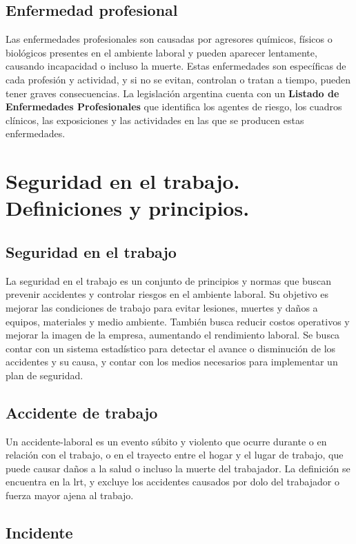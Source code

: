 \subsection{Enfermedad profesional}

Las enfermedades profesionales son causadas por agresores químicos, físicos o
biológicos presentes en el ambiente laboral y pueden aparecer lentamente,
causando incapacidad o incluso la muerte. Estas enfermedades son específicas de
cada profesión y actividad, y si no se evitan, controlan o tratan a tiempo,
pueden tener graves consecuencias. La legislación argentina cuenta con un
\textbf{Listado de Enfermedades Profesionales} que identifica los agentes de
riesgo, los cuadros clínicos, las exposiciones y las actividades en las que se
producen estas enfermedades.

\section{Seguridad en el trabajo. Definiciones y principios.}

\subsection{Seguridad en el trabajo}

La seguridad en el trabajo es un conjunto de principios y normas que buscan
prevenir accidentes y controlar riesgos en el ambiente laboral. Su objetivo es
mejorar las condiciones de trabajo para evitar lesiones, muertes y daños a
equipos, materiales y medio ambiente. También busca reducir costos operativos y
mejorar la imagen de la empresa, aumentando el rendimiento laboral. Se busca
contar con un sistema estadístico para detectar el avance o disminución de los
accidentes y su causa, y contar con los medios necesarios para implementar un
plan de seguridad.

\subsection{Accidente de trabajo}

Un \gls{accidente-laboral} es un evento súbito y violento que ocurre durante
o en relación con el trabajo, o en el trayecto entre el hogar y el lugar de 
trabajo, que puede causar daños a la salud o incluso la muerte del trabajador.
La definición se encuentra en la \acrfull{lrt}, y excluye los accidentes
causados por dolo del trabajador o fuerza mayor ajena al trabajo.

\subsection{Incidente}

